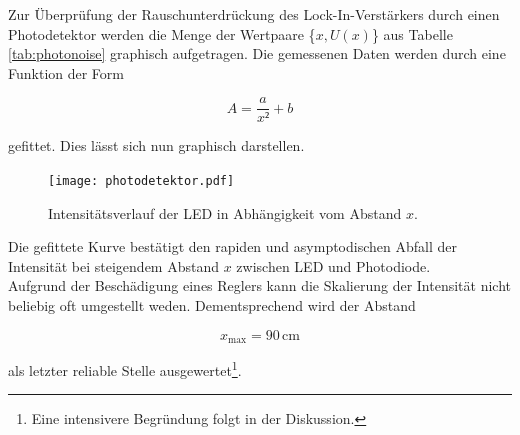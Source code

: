 Zur Überprüfung der Rauschunterdrückung des Lock-In-Verstärkers durch einen Photodetektor werden die Menge der Wertpaare
\{$x,U(x)$\} aus Tabelle \ref{tab:photonoise} graphisch aufgetragen. Die gemessenen Daten werden durch eine Funktion der Form

\begin{equation*}
    A = \frac{a}{x²} + b
\end{equation*}

\noindent gefittet. Dies lässt sich nun graphisch darstellen.

\begin{figure}
    \centering
    \texttt{[image: photodetektor.pdf]}
    \caption{Intensitätsverlauf der LED in Abhängigkeit vom Abstand $x$.}
    \label{fig:photoabb}
\end{figure}

\noindent Die gefittete Kurve bestätigt den rapiden und asymptodischen Abfall der Intensität bei steigendem
Abstand $x$ zwischen LED und Photodiode.\\
Aufgrund der Beschädigung eines Reglers kann die Skalierung der Intensität nicht beliebig oft umgestellt weden. 
Dementsprechend wird der Abstand 

\begin{equation*}
    x_\text{max} = 90\,\unit{\centi\meter}
\end{equation*}

\noindent als letzter reliable Stelle ausgewertet\footnote{Eine intensivere Begründung folgt in der Diskussion.}.
%
